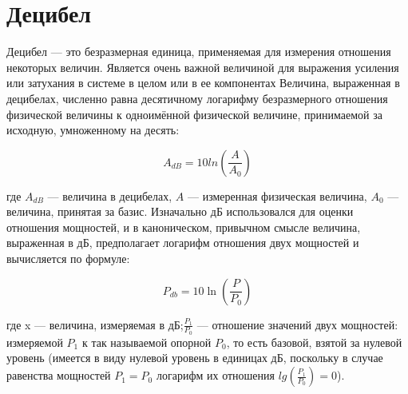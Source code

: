 
\section{Децибел}
Децибел --- это безразмерная единица, применяемая для измерения отношения некоторых величин. Является очень важной величиной для выражения усиления или затухания в системе в целом или в ее компонентах
Величина, выраженная в децибелах, численно равна десятичному логарифму безразмерного отношения физической величины к одноимённой физической величине, принимаемой за исходную, умноженному на десять:

\[A_{dB}=10 ln(\frac{A}{A_{0}})\]

где $A_{dB}$ — величина в децибелах, $A$ --- измеренная физическая величина, $A_{0}$ --- величина, принятая за базис.
Изначально дБ использовался для оценки отношения мощностей, и в каноническом, привычном смысле величина, выраженная в дБ, предполагает логарифм отношения двух мощностей и вычисляется по формуле:

\[ P_{db}=10\ln{(\dfrac{P}{P_{0}})} \]

где x --- величина, измеряемая в дБ;$\frac{P_{1}}{P_{0}}$ --- отношение значений двух мощностей: измеряемой $P_{1}$ к так называемой опорной $P_{0}$, то есть базовой, взятой за нулевой уровень (имеется в виду нулевой уровень в единицах дБ, поскольку в случае равенства мощностей $P_{1} = P_{0}$ логарифм их отношения $lg(\frac{P_{1}}{P_{0}}) = 0$).

